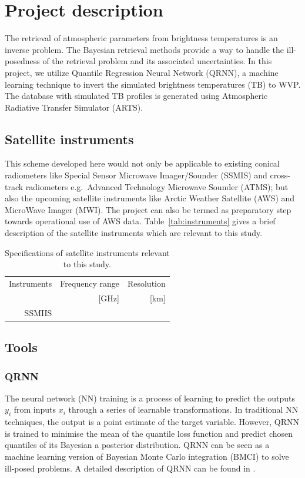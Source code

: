 \documentclass[12pt,oneside,a4paper]{article}
\begin{document}
\section{Project description}

The retrieval of atmospheric parameters from brightness temperatures is an inverse problem. The Bayesian retrieval methods provide a way to handle the ill-posedness of the retrieval problem and its associated uncertainties. In this project, we utilize  Quantile Regression Neural Network (QRNN), a machine learning technique to invert the simulated brightness temperatures (TB) to WVP. The database with simulated TB profiles is generated using Atmospheric Radiative Transfer Simulator (ARTS). 
 
\subsection{Satellite instruments}
This scheme developed here would not only be applicable to existing conical radiometers like  Special Sensor Microwave Imager/Sounder (SSMIS) and cross-track radiometers e.g.\, Advanced Technology Microwave Sounder (ATMS); but also the upcoming satellite instruments like Arctic Weather Satellite (AWS) and MicroWave Imager (MWI). The project can also be termed as preparatory step towards operational use of AWS data. Table~\ref{tab:instruments} gives a brief description of the satellite instruments which are relevant to this study. 

\begin{table}[t]
	\caption{Specifications of satellite instruments relevant to this study.}
	\label{tab:specifications_instruments}	
	\begin{tabular}{rrr}

		Instruments & Frequency range 	& Resolution  \\
					& [GHz]				& [km]			\\
		\hline			
		SSMIIS		&

		\hline			

	\end{tabular}
\end{table}

 
\subsection{Tools}
\subsubsection{QRNN}
%
\label{sec:qrnn}
The neural network (NN) training is a process of learning to predict the outputs {$y_i$} from inputs {$x_i$} through a series of learnable transformations. In traditional NN techniques, the output is a point estimate of the target variable. However, QRNN is trained to minimise the mean of the quantile loss function and predict chosen quantiles of its Bayesian a posterior distribution. QRNN can be seen as a machine learning version of Bayesian Monte Carlo integration (BMCI) to solve ill-posed problems. A detailed description of QRNN can be found in \citet{pfreundschuh:aneur:18}.  
\end{document}
